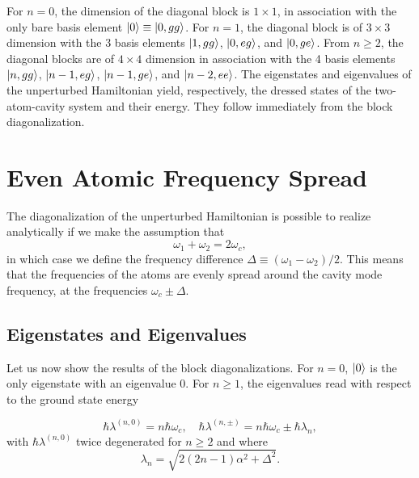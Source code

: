 For $n=0$, the dimension of the diagonal block is $1 \times 1$, in association with the only bare basis element $| 0 \rangle \equiv | 0,gg \rangle$. For $n=1$, the diagonal block is of $3 \times 3$ dimension with the 3 basis elements $| 1,gg \rangle$, $| 0,eg \rangle$, and $| 0,ge \rangle$. From $n \ge 2$, the diagonal blocks are of $4 \times 4$ dimension in association with the 4 basis elements $| n,gg \rangle$, $| n-1,eg \rangle$, $| n-1,ge \rangle$, and $| n-2,ee \rangle$. The eigenstates and eigenvalues of the unperturbed Hamiltonian yield, respectively, the dressed states of the two-atom-cavity system and their energy. They follow immediately from the block diagonalization.

\section{Even Atomic Frequency Spread}  \label{sec-delta}

The diagonalization of the unperturbed Hamiltonian is possible to realize analytically if we make the assumption that
\[ \omega_1 + \omega_2 = 2 \omega_c, \]
in which case we define the frequency difference $\Delta \equiv (\omega_1-\omega_2)/2$. This means that the frequencies of the atoms are evenly spread around the cavity mode frequency, at the frequencies $\omega_c \pm \Delta$.

\subsection{Eigenstates and Eigenvalues}

Let us now show the results of the block diagonalizations. For $n=0$, $| 0 \rangle$ is the only eigenstate with an eigenvalue 0. For $n \geq 1$, the eigenvalues read with respect to the ground state energy

\begin{equation}
    \hbar \lambda^{(n,0)} = n \hbar \omega_c, \quad \hbar \lambda^{(n,\pm)} = n \hbar \omega_c \pm \hbar \lambda_n,
\end{equation}
with $\hbar \lambda^{(n,0)}$ twice degenerated for $n \geq 2$ and where
\begin{equation}
    \lambda_n = \sqrt{ 2(2n-1) \alpha^2 + \Delta^2}.
\end{equation}

